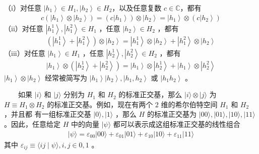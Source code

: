 \documentclass[a4paper,11pt,english]{sphinxmanual}
\begin{document}
\sphinxAtStartPar
（i）对任意 \(\left|h_{1}\right\rangle \in H_{1},\left|h_{2}\right\rangle \in H_{2}\) ​ ，以及任意复数  \(c \in \mathbb{C}\) ​，都有
\begin{equation*}
\begin{split}c\left(\left|h_{1}\right\rangle \otimes\left|h_{2}\right\rangle\right)=\left(c\left|h_{1}\right\rangle\right) \otimes\left|h_{2}\right\rangle=\left|h_{1}\right\rangle \otimes\left(c\left|h_{2}\right\rangle\right)\end{split}
\end{equation*}
\sphinxAtStartPar
（ii）对任意 \(\left|h_{1}^{1}\right\rangle,\left|h_{1}^{2}\right\rangle \in H_{1}\)  ，任意 \(\left|h_{2}\right\rangle \in H_{2}\)  ，都有
\begin{equation*}
\begin{split}\left(\left|h_{1}^{1}\right\rangle+\left|h_{1}^{2}\right\rangle\right) \otimes\left|h_{2}\right\rangle=\left|h_{1}^{1}\right\rangle \otimes\left|h_{2}\right\rangle+\left|h_{1}^{2}\right\rangle \otimes\left|h_{2}\right\rangle\end{split}
\end{equation*}
\sphinxAtStartPar
（iii）对任意  \(\left|h_{1}\right\rangle \in H_{1}\)  ，任意  \(\left|h_{2}^{1}\right\rangle,\left|h_{2}^{2}\right\rangle \in H_{2}\) ，都有
\begin{equation*}
\begin{split}\left|h_{1}\right\rangle \otimes\left(\left|h_{2}^{1}\right\rangle+\left|h_{2}^{2}\right\rangle\right)=\left|h_{1}\right\rangle \otimes\left|h_{2}^{1}\right\rangle+\left|h_{1}\right\rangle \otimes\left|h_{2}^{2}\right\rangle\end{split}
\end{equation*}
\sphinxAtStartPar
\(\left|h_{1}\right\rangle \otimes\left|h_{2}\right\rangle\)  经常被简写为   \(\left|h_{1}\right\rangle\left|h_{2}\right\rangle,\left|h_{1}, h_{2}\right\rangle\) 或  \(\left|h_{1} h_{2}\right\rangle\)  。

\sphinxAtStartPar
  如果  \(|i\rangle\) 和  \(|j\rangle\) 分别为  \(H_{1}\) 和  \(H_{2}\) 的标准正交基，那么  \(|i\rangle \otimes|j\rangle\) 为  \(H \equiv H_{1} \otimes H_{2}\) 的标准正交基。例如，现在有两个 \(2\) 维的希尔伯特空间  \(H_{1}\) 和  \(H_{2}\) ，并且都 有一组标准正交基  \({|0\rangle,|1\rangle}\) ，那么  \(H\) 的标准正交基为  \({|00\rangle,|01\rangle,|10\rangle,|11\rangle}\) 。因此，任意给定  \(H\) 中的向量  \(|\psi\rangle\) 都可以表示成这组标准正交基的线性组合
\begin{equation*}
\begin{split}|\psi\rangle=\varepsilon_{00}|00\rangle+\varepsilon_{01}|01\rangle+\varepsilon_{10}|10\rangle+\varepsilon_{11}|11\rangle\end{split}
\end{equation*}
\sphinxAtStartPar
其中  \(\varepsilon_{i j} \equiv\langle i j \mid \psi\rangle, i, j \in{0,1}\) 。
\end{document}
